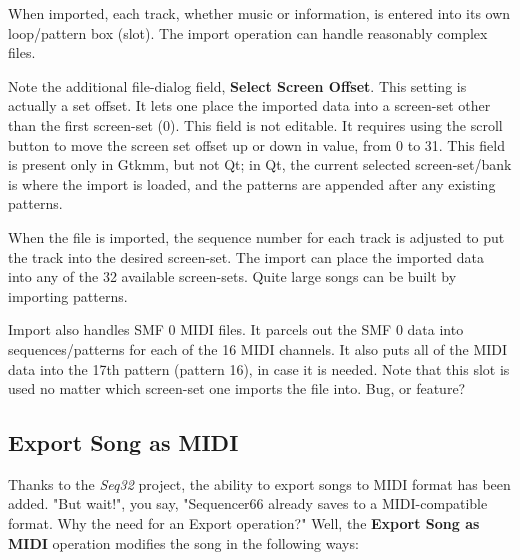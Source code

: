    When imported, each track, whether music or information,
   is entered into its own loop/pattern box (slot).
   The import operation can handle reasonably complex files.

   Note the additional file-dialog field,
   \textbf{Select Screen Offset}.
   This setting is actually a set offset.
   It lets one place the imported data into a screen-set other than
   the first screen-set (0).
   This field is not editable.
   It requires using the scroll button to move the
   screen set offset up or down in value, from 0 to 31.
   This field is present only in Gtkmm, but not Qt;
   in Qt, the current selected screen-set/bank is where the import is loaded,
   and the patterns are appended after any existing patterns.

   When the file is imported, the sequence number for each track is
   adjusted to put the track into the desired screen-set.
   The import can place the imported data into any of the 32 available
   screen-sets.  Quite large songs can be built by importing patterns.

   Import also handles SMF 0 MIDI files.  It parcels out the SMF 0 data
   into sequences/patterns for each of the 16 MIDI channels.  It also puts
   all of the MIDI data into the 17th pattern (pattern 16), in case it is
   needed.  Note that this slot is used no matter which screen-set one imports
   the file into.  Bug, or feature?

\subsection{Export Song as MIDI}
\label{subsec:seq66_midi_export_file_export}

   Thanks to the \textsl{Seq32} project, the ability to export songs to MIDI
   format has been added.
   "But wait!", you say, "Sequencer66 already saves to a MIDI-compatible
   format.  Why the need for an Export operation?"
   Well, the \textbf{Export Song as MIDI} operation modifies the song in the
   following ways:

